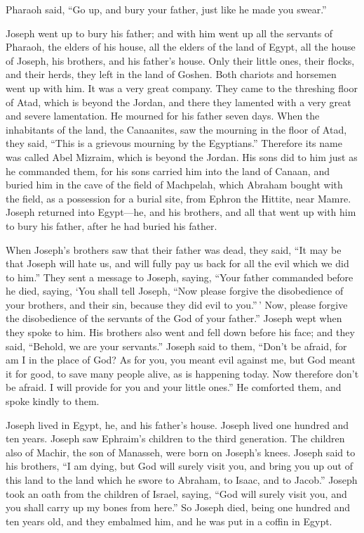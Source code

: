  Pharaoh said, ``Go up, and bury your father, just like he
made you swear.''

 Joseph went up to bury his father; and with him went up
all the servants of Pharaoh, the elders of his house, all the elders of
the land of Egypt,  all the house of Joseph, his brothers,
and his father's house. Only their little ones, their flocks, and their
herds, they left in the land of Goshen.  Both chariots and
horsemen went up with him. It was a very great company. 
They came to the threshing floor of Atad, which is beyond the Jordan,
and there they lamented with a very great and severe lamentation. He
mourned for his father seven days.  When the inhabitants
of the land, the Canaanites, saw the mourning in the floor of Atad, they
said, ``This is a grievous mourning by the Egyptians.'' Therefore its
name was called Abel Mizraim, which is beyond the Jordan.
 His sons did to him just as he commanded them,
 for his sons carried him into the land of Canaan, and
buried him in the cave of the field of Machpelah, which Abraham bought
with the field, as a possession for a burial site, from Ephron the
Hittite, near Mamre.  Joseph returned into Egypt---he,
and his brothers, and all that went up with him to bury his father,
after he had buried his father.

 When Joseph's brothers saw that their father was dead,
they said, ``It may be that Joseph will hate us, and will fully pay us
back for all the evil which we did to him.''  They sent a
message to Joseph, saying, ``Your father commanded before he died,
saying,  `You shall tell Joseph, ``Now please forgive the
disobedience of your brothers, and their sin, because they did evil to
you.''\,' Now, please forgive the disobedience of the servants of the
God of your father.'' Joseph wept when they spoke to him.
 His brothers also went and fell down before his face;
and they said, ``Behold, we are your servants.''  Joseph
said to them, ``Don't be afraid, for am I in the place of God?
 As for you, you meant evil against me, but God meant it
for good, to save many people alive, as is happening today.
 Now therefore don't be afraid. I will provide for you
and your little ones.'' He comforted them, and spoke kindly to them.

 Joseph lived in Egypt, he, and his father's house.
Joseph lived one hundred and ten years.  Joseph saw
Ephraim's children to the third generation. The children also of Machir,
the son of Manasseh, were born on Joseph's knees.  Joseph
said to his brothers, ``I am dying, but God will surely visit you, and
bring you up out of this land to the land which he swore to Abraham, to
Isaac, and to Jacob.''  Joseph took an oath from the
children of Israel, saying, ``God will surely visit you, and you shall
carry up my bones from here.''  So Joseph died, being one
hundred and ten years old, and they embalmed him, and he was put in a
coffin in Egypt.
